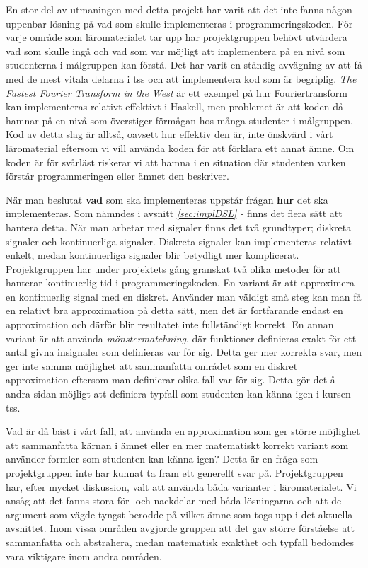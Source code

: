 \documentclass[12pt,a4paper,twoside,openright]{article}
\begin{document}
En stor del av utmaningen med detta projekt har varit att det inte
fanns någon uppenbar lösning på vad som skulle implementeras i
programmeringskoden. För varje område som läromaterialet tar upp har
projektgruppen behövt utvärdera vad som skulle ingå och vad som var
möjligt att implementera på en nivå som studenterna i målgruppen kan
förstå. Det har varit en ständig avvägning av att få med de mest
vitala delarna i \gls{tss} och att implementera kod som är
begriplig. \textit{The Fastest Fourier Transform in the West}
\cite{fastestfourier} är ett exempel på hur Fouriertransform kan
implementeras relativt effektivt i Haskell, men problemet är att koden
då hamnar på en nivå som överstiger förmågan hos många studenter i
målgruppen. Kod av detta slag är alltså, oavsett hur effektiv den är,
inte önskvärd i vårt läromaterial eftersom vi vill använda koden för
att förklara ett annat ämne. Om koden är för svårläst riskerar vi att
hamna i en situation där studenten varken förstår programmeringen
eller ämnet den beskriver.

När man beslutat \textbf{vad} som ska implementeras uppstår frågan
\textbf{hur} det ska implementeras. Som nämndes i avsnitt
\textit{\ref{sec:implDSL} - } finns det flera
sätt att hantera detta. När man arbetar med signaler finns det två
grundtyper; diskreta signaler och kontinuerliga signaler. Diskreta
signaler kan implementeras relativt enkelt, medan kontinuerliga
signaler blir betydligt mer komplicerat. Projektgruppen har under
projektets gång granskat två olika metoder för att hanterar
kontinuerlig tid i programmeringskoden. En variant är att approximera
en kontinuerlig signal med en diskret. Använder man väldigt små steg
kan man få en relativt bra approximation på detta sätt, men det är
fortfarande endast en approximation och därför blir resultatet inte
fullständigt korrekt.
En annan variant är att använda \textit{mönstermatchning}, där
funktioner definieras exakt för ett antal givna insignaler som
definieras var för sig. Detta ger mer korrekta svar, men ger inte
samma möjlighet att sammanfatta
området som en diskret approximation eftersom man definierar olika
fall var för sig. Detta gör det å andra sidan möjligt att definiera
typfall som studenten kan känna igen i kursen \gls{tss}.

Vad är då bäst i vårt fall, att använda en approximation som ger
större möjlighet att %
sammanfatta kärnan i ämnet eller en mer matematiskt korrekt variant
som använder formler som studenten kan känna igen? Detta är en fråga
som projektgruppen inte har kunnat ta fram ett generellt svar
på. Projektgruppen har, efter mycket diskussion, valt att använda båda
varianter i läromaterialet. Vi ansåg att det fanns stora för- och
nackdelar med båda lösningarna och att de argument som vägde tyngst
berodde på vilket ämne som togs upp i det aktuella avsnittet. Inom
vissa områden avgjorde gruppen att det gav större förståelse att
sammanfatta och abstrahera, medan matematisk exakthet och typfall
bedömdes vara viktigare inom andra områden.
\end{document}
